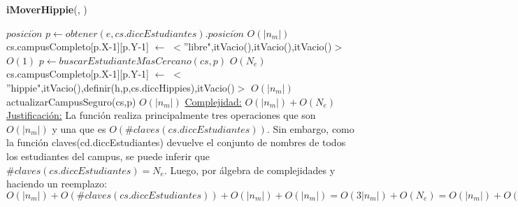 \begin{Algoritmos}
\begin{algorithm}[H]{\textbf{iMoverHippie}(, )}
	\begin{algorithmic}
	    \State $posici\acute{o}n$ $p \gets obtener(e,cs.diccEstudiantes).posici\acute{o}n$	 		\Comment $O(|n_{m}|)$
	  	\State cs.campusCompleto[p.X-1][p.Y-1] $\gets$ $<$''libre",itVacio(),itVacio(),itVacio()$>$	\Comment $O(1)$
        \State $p \gets buscarEstudianteM\acute{a}sCercano(cs,p)$	\Comment $O(N_{e})$
    	\State cs.campusCompleto[p.X-1][p.Y-1] $\gets$ $<$''hippie",itVacio(),definir(h,p,cs.diccHippies),itVacio()$>$	\Comment $O(|n_{m}|)$
        \State actualizarCampusSeguro(cs,p)	\Comment $O(|n_{m}|)$
        \medskip
		\Statex \underline{Complejidad:} $O(|n_{m}|) + O(N_{e})$
        \Statex \underline{Justificaci\'on:} La funci\'on realiza principalmente tres operaciones que son $O(|n_{m}|)$ y una que es $O(\#claves(cs.diccEstudiantes))$. Sin embargo, como la funci\'on claves(cd.diccEstudiantes) devuelve el conjunto de nombres de todos los estudiantes del campus, se puede inferir que $\#claves(cs.diccEstudiantes) = N_{e}$. Luego, por \'algebra de complejidades y haciendo un reemplazo: $O(|n_{m}|) + O(\#claves(cs.diccEstudiantes)) + O(|n_{m}|) + O(|n_{m}|) = O(3|n_{m}|) + O(N_{e}) = O(|n_{m}|) + O(N_{e})$
	\end{algorithmic}
\end{algorithm}


\end{Algoritmos}
